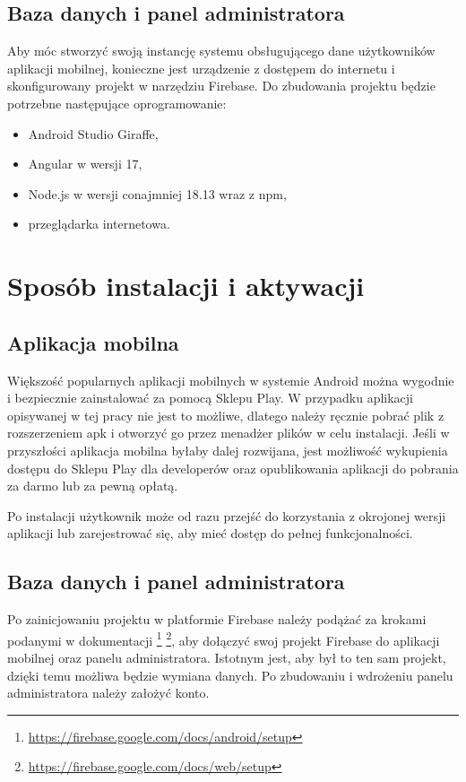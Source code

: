\documentclass[a4paper,twoside,12pt]{book}
\begin{document}
\subsection{Baza danych i panel administratora}

Aby móc stworzyć swoją instancję systemu obsługującego dane użytkowników aplikacji mobilnej, konieczne jest urządzenie z dostępem do internetu i skonfigurowany projekt w narzędziu Firebase. Do zbudowania projektu będzie potrzebne następujące oprogramowanie:
\begin{itemize}
\item Android Studio Giraffe,
\item Angular w wersji 17,
\item Node.js w wersji conajmniej 18.13 wraz z npm,
\item przeglądarka internetowa.
\end{itemize}

\section{Sposób instalacji i aktywacji}

\subsection{Aplikacja mobilna}
Większość popularnych aplikacji mobilnych w systemie Android można wygodnie i bezpiecznie zainstalować za pomocą Sklepu Play. W przypadku aplikacji opisywanej w tej pracy nie jest to możliwe, dlatego należy ręcznie pobrać plik z rozszerzeniem apk i otworzyć go przez menadżer plików w celu instalacji. Jeśli w przyszłości aplikacja mobilna byłaby dalej rozwijana, jest możliwość wykupienia dostępu do Sklepu Play dla developerów oraz opublikowania aplikacji do pobrania za darmo lub za pewną opłatą. 

Po instalacji użytkownik może od razu przejść do korzystania z okrojonej wersji aplikacji lub zarejestrować się, aby mieć dostęp do pełnej funkcjonalności. 

\subsection{Baza danych i panel administratora}

Po zainicjowaniu projektu w platformie Firebase należy podążać za krokami podanymi w dokumentacji \footnote{\url{https://firebase.google.com/docs/android/setup}} \footnote{\url{https://firebase.google.com/docs/web/setup}}, aby dołączyć swoj projekt Firebase do aplikacji mobilnej oraz panelu administratora. Istotnym jest, aby był to ten sam projekt, dzięki temu możliwa będzie wymiana danych. Po zbudowaniu i wdrożeniu panelu administratora należy założyć konto. 
\end{document}
